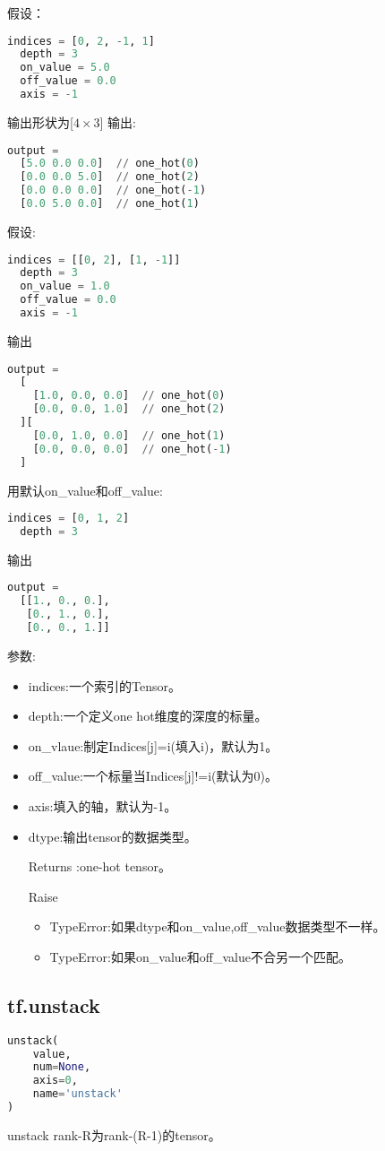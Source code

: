 假设：
\begin{lstlisting}[language=Python]
indices = [0, 2, -1, 1]
  depth = 3
  on_value = 5.0
  off_value = 0.0
  axis = -1
\end{lstlisting}
输出形状为[$4\times3$]
输出:
\begin{lstlisting}[language=Python]
output =
  [5.0 0.0 0.0]  // one_hot(0)
  [0.0 0.0 5.0]  // one_hot(2)
  [0.0 0.0 0.0]  // one_hot(-1)
  [0.0 5.0 0.0]  // one_hot(1)
\end{lstlisting}
假设:
\begin{lstlisting}[language=Python]
 indices = [[0, 2], [1, -1]]
  depth = 3
  on_value = 1.0
  off_value = 0.0
  axis = -1

\end{lstlisting}
输出
\begin{lstlisting}[language=Python]
output =
  [
    [1.0, 0.0, 0.0]  // one_hot(0)
    [0.0, 0.0, 1.0]  // one_hot(2)
  ][
    [0.0, 1.0, 0.0]  // one_hot(1)
    [0.0, 0.0, 0.0]  // one_hot(-1)
  ]
\end{lstlisting}
用默认on\_value和off\_value:
\begin{lstlisting}[language=Python]
indices = [0, 1, 2]
  depth = 3
\end{lstlisting}
输出
\begin{lstlisting}[language=Python]
  output =
  [[1., 0., 0.],
   [0., 1., 0.],
   [0., 0., 1.]]
\end{lstlisting}
参数:
\begin{itemize}
\item indices:一个索引的Tensor。
\item depth:一个定义one hot维度的深度的标量。
\item on\_vlaue:制定Indices[j]=i(填入i)，默认为1。
\item off\_value:一个标量当Indices[j]!=i(默认为0)。
\item axis:填入的轴，默认为-1。
\item dtype:输出tensor的数据类型。
\item [Returns]:one-hot tensor。
\item [Raise]
\begin{itemize}
\item TypeError:如果dtype和on\_value,off\_value数据类型不一样。
\item TypeError:如果on\_value和off\_value不合另一个匹配。
\end{itemize}
\end{itemize}
\subsection{tf.unstack}
\begin{lstlisting}[language=Python]
unstack(
    value,
    num=None,
    axis=0,
    name='unstack'
)
\end{lstlisting}
unstack rank-R为rank-(R-1)的tensor。

